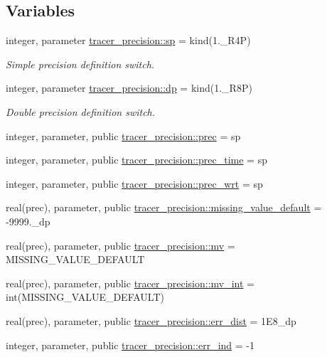 \subsection*{Variables}
\begin{DoxyCompactItemize}
\item 
integer, parameter \mbox{\hyperlink{namespacetracer__precision_aaa3f9cb7ed44699611a16d61ca9131fb}{tracer\+\_\+precision\+::sp}} = kind(1.\+\_\+\+R4P)
\begin{DoxyCompactList}\small\item\em Simple precision definition switch. \end{DoxyCompactList}\item 
integer, parameter \mbox{\hyperlink{namespacetracer__precision_a21febe1c6d584cd6b7995a7abc568efb}{tracer\+\_\+precision\+::dp}} = kind(1.\+\_\+\+R8P)
\begin{DoxyCompactList}\small\item\em Double precision definition switch. \end{DoxyCompactList}\item 
integer, parameter, public \mbox{\hyperlink{namespacetracer__precision_a8a01094f67c69ab389329d205a7c4cc6}{tracer\+\_\+precision\+::prec}} = sp
\item 
integer, parameter, public \mbox{\hyperlink{namespacetracer__precision_acd72fad1267e87137f00ec7d21d5a0cb}{tracer\+\_\+precision\+::prec\+\_\+time}} = sp
\item 
integer, parameter, public \mbox{\hyperlink{namespacetracer__precision_a57302c8b2d241e00360158d172f89d3c}{tracer\+\_\+precision\+::prec\+\_\+wrt}} = sp
\item 
real(prec), parameter, public \mbox{\hyperlink{namespacetracer__precision_ac24699f2eab5a0427f3ec0f8f7715a40}{tracer\+\_\+precision\+::missing\+\_\+value\+\_\+default}} = -\/9999.\+\_\+dp
\item 
real(prec), parameter, public \mbox{\hyperlink{namespacetracer__precision_a783785f78c8f38be24eef86ccd426c6e}{tracer\+\_\+precision\+::mv}} = M\+I\+S\+S\+I\+N\+G\+\_\+\+V\+A\+L\+U\+E\+\_\+\+D\+E\+F\+A\+U\+LT
\item 
real(prec), parameter, public \mbox{\hyperlink{namespacetracer__precision_abddd3613902872af708334a2c29dc468}{tracer\+\_\+precision\+::mv\+\_\+int}} = int(M\+I\+S\+S\+I\+N\+G\+\_\+\+V\+A\+L\+U\+E\+\_\+\+D\+E\+F\+A\+U\+LT)
\item 
real(prec), parameter, public \mbox{\hyperlink{namespacetracer__precision_ac58a793d67c36de01068a6315cb0211f}{tracer\+\_\+precision\+::err\+\_\+dist}} = 1\+E8\+\_\+dp
\item 
integer, parameter, public \mbox{\hyperlink{namespacetracer__precision_a8a4267e1aa9cc99d32b65d07cb31cb2a}{tracer\+\_\+precision\+::err\+\_\+ind}} = -\/1
\end{DoxyCompactItemize}
